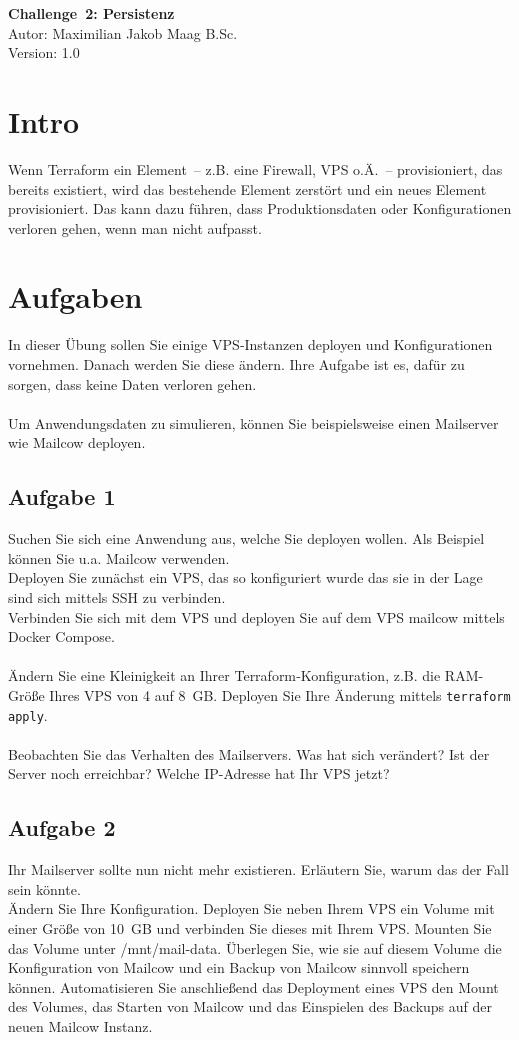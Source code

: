 \documentclass{article}
\begin{document}
    \begin{center}
        \Large \textbf{Challenge 2: Persistenz} \\ [6pt]
        \normalsize
        Autor: Maximilian Jakob Maag B.Sc. \\
        Version: 1.0
    \end{center}
    \section{Intro}
    Wenn Terraform ein Element – z.B. eine Firewall, VPS o.Ä. – provisioniert, das bereits existiert, wird das bestehende Element zerstört und ein neues
    Element provisioniert. Das kann dazu führen, dass Produktionsdaten oder Konfigurationen verloren gehen, wenn man nicht aufpasst.
    \section{Aufgaben}
In dieser Übung sollen Sie einige VPS‑Instanzen deployen und Konfigurationen vornehmen. Danach werden Sie diese ändern.
    Ihre Aufgabe ist es, dafür zu sorgen, dass keine Daten verloren gehen. \\ \\
    Um Anwendungsdaten zu simulieren, können Sie beispielsweise einen Mailserver wie Mailcow deployen.
    \subsection{Aufgabe 1}
    Suchen Sie sich eine Anwendung aus, welche Sie deployen wollen. Als Beispiel können Sie u.a. Mailcow verwenden. \\
    Deployen Sie zunächst ein VPS, das so konfiguriert wurde das sie in der Lage sind sich mittels SSH zu verbinden. \\ 
    Verbinden Sie sich mit dem VPS und deployen Sie auf dem VPS mailcow mittels Docker Compose. \\ \\
    Ändern Sie eine Kleinigkeit an Ihrer Terraform‑Konfiguration, z.B. die RAM-Größe Ihres VPS von 4 auf 8 GB.
    Deployen Sie Ihre Änderung mittels \texttt{terraform apply}. \\ \\
    Beobachten Sie das Verhalten des Mailservers. Was hat sich verändert? Ist der Server noch erreichbar? Welche IP-Adresse hat Ihr VPS jetzt?
    \subsection{Aufgabe 2}
    Ihr Mailserver sollte nun nicht mehr existieren. Erläutern Sie, warum das der Fall sein könnte. \\
    Ändern Sie Ihre Konfiguration. Deployen Sie neben Ihrem VPS ein Volume mit einer Größe von 10 GB und verbinden Sie dieses mit Ihrem VPS.
    Mounten Sie das Volume unter /mnt/mail-data.
    Überlegen Sie, wie sie auf diesem Volume die Konfiguration von Mailcow und ein Backup von Mailcow sinnvoll speichern  können.
    Automatisieren Sie anschließend das Deployment eines VPS den Mount des Volumes, das Starten von Mailcow und das Einspielen des Backups auf der neuen Mailcow Instanz.
\end{document}
